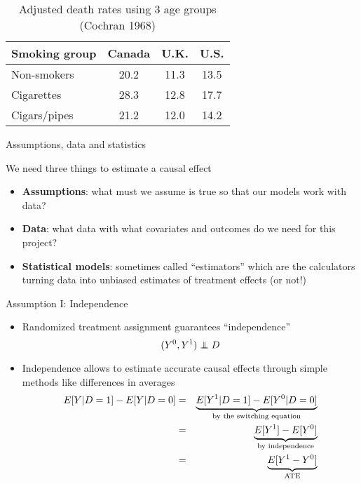 \documentclass{beamer}
\newcommand\independent{\protect\mathpalette{\protect\independenT}{\perp}}
\def\independenT#1#2{\mathrel{\rlap{$#1#2$}\mkern2mu{#1#2}}}
\begin{document}
\begin{frame}[plain]

	\begin{table}\centering
	\caption{Adjusted death rates using 3 age groups (Cochran 1968)}
		\begin{center}
		\begin{tabular}{lccc}
		\hline \hline
		\multicolumn{1}{l}{Smoking group}&
		\multicolumn{1}{c}{Canada}&
		\multicolumn{1}{c}{U.K.}&
		\multicolumn{1}{c}{U.S.}\\
		\hline
		Non-smokers & 20.2 & 11.3 & 13.5 \\
		Cigarettes & 28.3 & 12.8  &  17.7 \\
		Cigars/pipes & 21.2 & 12.0 & 14.2 \\
		\hline
		\end{tabular}
		\end{center}
	\end{table}

\end{frame}


\begin{frame}{Assumptions, data and statistics}

We need three things to estimate a causal effect
\begin{itemize}
\item \textbf{Assumptions}: what must we assume is true so that our models work with data?
\item \textbf{Data}: what data with what covariates and outcomes do we need for this project?
\item \textbf{Statistical models}: sometimes called ``estimators'' which are the calculators turning data into unbiased estimates of treatment effects (or not!)
\end{itemize}

\end{frame}

\begin{frame}{Assumption I: Independence}
	
	\begin{itemize}
	\item Randomized treatment assignment guarantees ``independence'' $$(Y^0,Y^1)\independent{D}$$
	\item Independence allows to estimate accurate causal effects through simple methods like differences in averages
		\begin{eqnarray*}
		E[Y|D=1] - E[Y|D=0] &=& \underbrace{E[Y^1|D=1] - E[Y^0|D=0]}_{\mathclap{\text{by the switching equation}}} \\
		&=& \underbrace{E[Y^1] - E[Y^0]}_{\mathclap{\text{by independence}}} \\
		&=& \underbrace{E[Y^1-Y^0]}_{\mathclap{\text{ATE}}}
		\end{eqnarray*}
	\end{itemize}
\end{frame}
\end{document}
